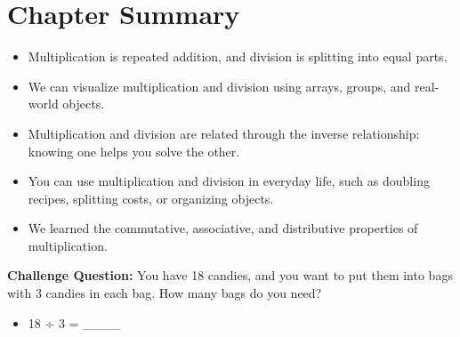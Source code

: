 \section{Chapter Summary}
\begin{itemize}
    \item Multiplication is repeated addition, and division is splitting into equal parts.
    \item We can visualize multiplication and division using arrays, groups, and real-world objects.
    \item Multiplication and division are related through the inverse relationship: knowing one helps you solve the other.
    \item You can use multiplication and division in everyday life, such as doubling recipes, splitting costs, or organizing objects.
    \item We learned the commutative, associative, and distributive properties of multiplication.
\end{itemize}

\textbf{Challenge Question:}
You have 18 candies, and you want to put them into bags with 3 candies in each bag. How many bags do you need?
\begin{itemize}
    \item 18 ÷ 3 = \_\_\_\_
\end{itemize}